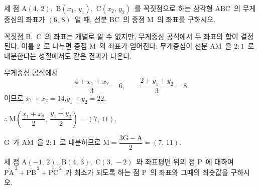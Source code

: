 \documentclass[10pt]{article}
\begin{document}
\begin{dmproblem}
세 점 $\mathrm{A}(4,\, 2)$,\ $\mathrm{B}(x_1,\, y_1)$,\ $\mathrm{C}(x_2,\, y_2)$\ 를 꼭짓점으로 하는 삼각형 $\mathrm{ABC}$\ 의 무게중심의 좌표가 $(6,\, 8)$\ 일 때, 선분 $\overline{\mathrm{BC}}$\ 의 중점 $\mathrm{M}$\ 의 좌표를 구하시오.
\end{dmproblem}

\begin{dmapproach}
꼭짓점 $\mathrm{B}$,\ $\mathrm{C}$\ 의 좌표는 개별로 알 수 없지만, 무게중심 공식에서 두 좌표의 합이 결정된다. 이를 $2$\ 로 나누면 중점 $\mathrm{M}$\ 의 좌표가 얻어진다. 무게중심이 선분 $\overline{\mathrm{AM}}$\ 을 $2 : 1$\ 로 내분한다는 성질에서도 같은 결과가 나온다.
\end{dmapproach}

\begin{dmsolution}
무게중심 공식에서
\begin{equation*}
  \frac{4 + x_1 + x_2}{3} = 6,\qquad \frac{2 + y_1 + y_2}{3} = 8
\end{equation*}
이므로 $x_1 + x_2 = 14$,\quad $y_1 + y_2 = 22$.

$\therefore\ \mathrm{M}\!\left( \dfrac{x_1 + x_2}{2},\ \dfrac{y_1 + y_2}{2} \right) = (7,\, 11)$.

 $\mathrm{G}$\ 가 $\overline{\mathrm{AM}}$\ 을 $2 : 1$\ 로 내분하므로 $\mathrm{M} = \dfrac{3\mathrm{G} - \mathrm{A}}{2} = (7,\, 11)$.
\end{dmsolution}

\dmchecktitle



\newpage


\begin{dmproblem}
세 점 $\mathrm{A}(-1,\, 2)$,\ $\mathrm{B}(4,\, 3)$,\ $\mathrm{C}(3,\, -2)$\ 와 좌표평면 위의 점 $\mathrm{P}$\ 에 대하여 $\overline{\mathrm{PA}}^{\,2} + \overline{\mathrm{PB}}^{\,2} + \overline{\mathrm{PC}}^{\,2}$\ 가 최소가 되도록 하는 점 $\mathrm{P}$\ 의 좌표와 그때의 최솟값을 구하시오.
\end{dmproblem}
\end{document}
